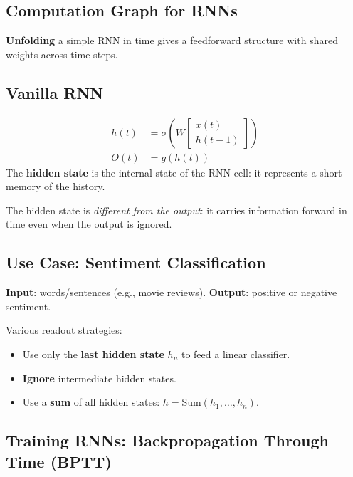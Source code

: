 \documentclass[11pt,a4paper]{article}
\begin{document}
\subsection{Computation Graph for RNNs}

\textbf{Unfolding} a simple RNN in time gives a feedforward structure with shared weights across time steps.

\subsection{Vanilla RNN}

\begin{definitionbox}[title=Vanilla RNN with Hidden State]
\begin{align*}
h(t) &= \sigma\!\left(W\begin{bmatrix} x(t) \\ h(t-1) \end{bmatrix}\right) \\
O(t) &= g(h(t))
\end{align*}
The \textbf{hidden state} is the internal state of the RNN cell: it represents a short memory of the history.
\end{definitionbox}

The hidden state is \emph{different from the output}: it carries information forward in time even when the output is ignored.

\subsection{Use Case: Sentiment Classification}

\textbf{Input}: words/sentences (e.g., movie reviews). \textbf{Output}: positive or negative sentiment.

Various readout strategies:
\begin{itemize}[leftmargin=*]
    \item Use only the \textbf{last hidden state} $h_n$ to feed a linear classifier.
    \item \textbf{Ignore} intermediate hidden states.
    \item Use a \textbf{sum} of all hidden states: $h = \text{Sum}(h_1, \ldots, h_n)$.
\end{itemize}

\subsection{Training RNNs: Backpropagation Through Time (BPTT)}
\end{document}
